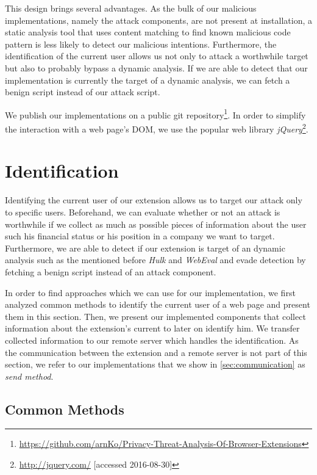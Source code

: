	This design brings several advantages. As the bulk of our malicious implementations, namely the attack components, are not present at installation, a static analysis tool that uses content matching to find known malicious code pattern is less likely to detect our malicious intentions. Furthermore, the identification of the current user allows us not only to attack a worthwhile target but also to probably bypass a dynamic analysis. If we are able to detect that our implementation is currently the target of a dynamic analysis, we can fetch a benign script instead of our attack script. 

	We publish our implementations on a public git repository\footnote{\url{https://github.com/arnKo/Privacy-Threat-Analysis-Of-Browser-Extensions}}. In order to simplify the interaction with a web page's DOM, we use the popular web library \textit{jQuery}\footnote{\url{http://jquery.com/} [accessed 2016-08-30]}. 

\newpage	
\section{Identification}
\label{sec:identification} 

	Identifying the current user of our extension allows us to target our attack only to specific users. Beforehand, we can evaluate whether or not an attack is worthwhile if we collect as much as possible pieces of information about the user such his financial status or his position in a company we want to target. Furthermore, we are able to detect if our extension is target of an dynamic analysis such as the mentioned before \textit{Hulk} and \textit{WebEval} and evade detection by fetching a benign script instead of an attack component.
	
	In order to find approaches which we can use for our implementation, we first analyzed common methods to identify the current user of a web page and present them in this section. Then, we present our implemented components that collect information about the extension's current to later on identify him. We transfer collected information to our remote server which handles the identification. As the communication between the extension and a remote server is not part of this section, we refer to our implementations that we show in \autoref{sec:communication} as \textit{send method}.
	
\subsection{Common Methods}

